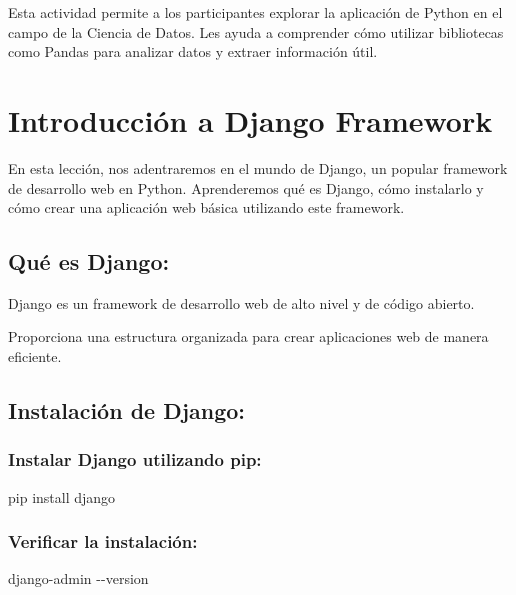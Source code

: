\documentclass[
  a4paper,
  DIV=11,
  numbers=noendperiod,
  onepage,
  openany]{scrreprt}
\newenvironment{Shaded}{\begin{snugshade}}{\end{snugshade}}
\newcommand{\AttributeTok}[1]{\textcolor[rgb]{0.40,0.45,0.13}{#1}}
\newcommand{\ExtensionTok}[1]{\textcolor[rgb]{0.00,0.23,0.31}{#1}}
\newcommand{\NormalTok}[1]{\textcolor[rgb]{0.00,0.23,0.31}{#1}}
\begin{document}
Esta actividad permite a los participantes explorar la aplicación de
Python en el campo de la Ciencia de Datos. Les ayuda a comprender cómo
utilizar bibliotecas como Pandas para analizar datos y extraer
información útil.

\chapter{Introducción a Django
Framework}\label{introducciuxf3n-a-django-framework}

En esta lección, nos adentraremos en el mundo de Django, un popular
framework de desarrollo web en Python. Aprenderemos qué es Django, cómo
instalarlo y cómo crear una aplicación web básica utilizando este
framework.

\section{Qué es Django:}\label{quuxe9-es-django}

Django es un framework de desarrollo web de alto nivel y de código
abierto.

Proporciona una estructura organizada para crear aplicaciones web de
manera eficiente.

\section{Instalación de Django:}\label{instalaciuxf3n-de-django}

\subsection{Instalar Django utilizando
pip:}\label{instalar-django-utilizando-pip}

\begin{Shaded}
\begin{Highlighting}[]
\ExtensionTok{pip}\NormalTok{ install django}
\end{Highlighting}
\end{Shaded}

\subsection{Verificar la
instalación:}\label{verificar-la-instalaciuxf3n}

\begin{Shaded}
\begin{Highlighting}[]
\ExtensionTok{django{-}admin} \AttributeTok{{-}{-}version}
\end{Highlighting}
\end{Shaded}
\end{document}

